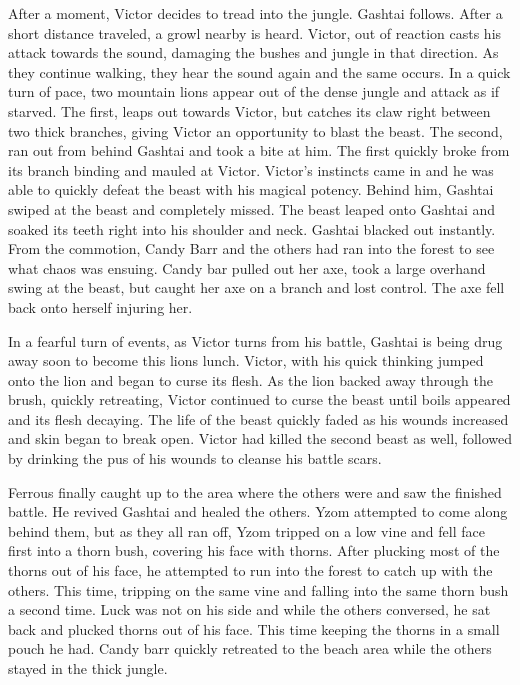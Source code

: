 After a moment, Victor decides to tread into the jungle. Gashtai follows. After a short distance traveled, a growl nearby is heard. Victor, out of reaction casts his attack towards the sound, damaging the bushes and jungle in that direction. As they continue walking, they hear the sound again and the same occurs. In a quick turn of pace, two mountain lions appear out of the dense jungle and attack as if starved. The first, leaps out towards Victor, but catches its claw right between two thick branches, giving Victor an opportunity to blast the beast. The second, ran out from behind Gashtai and took a bite at him. The first quickly broke from its branch binding and mauled at Victor. Victor's instincts came in and he was able to quickly defeat the beast with his magical potency. Behind him, Gashtai swiped at the beast and completely missed. The beast leaped onto Gashtai and soaked its teeth right into his shoulder and neck. Gashtai blacked out instantly. From the commotion, Candy Barr and the others had ran into the forest to see what chaos was ensuing. Candy bar pulled out her axe, took a large overhand swing at the beast, but caught her axe on a branch and lost control. The axe fell back onto herself injuring her.

In a fearful turn of events, as Victor turns from his battle, Gashtai is being drug away soon to become this lions lunch. Victor, with his quick thinking jumped onto the lion and began to curse its flesh. As the lion backed away through the brush, quickly retreating, Victor continued to curse the beast until boils appeared and its flesh decaying. The life of the beast quickly faded as his wounds increased and skin began to break open. Victor had killed the second beast as well, followed by drinking the pus of his wounds to cleanse his battle scars.

Ferrous finally caught up to the area where the others were and saw the finished battle. He revived Gashtai and healed the others. Yzom attempted to come along behind them, but as they all ran off, Yzom tripped on a low vine and fell face first into a thorn bush, covering his face with thorns. After plucking most of the thorns out of his face, he attempted to run into the forest to catch up with the others. This time, tripping on the same vine and falling into the same thorn bush a second time. Luck was not on his side and while the others conversed, he sat back and plucked thorns out of his face. This time keeping the thorns in a small pouch he had. Candy barr quickly retreated to the beach area while the others stayed in the thick jungle. 

